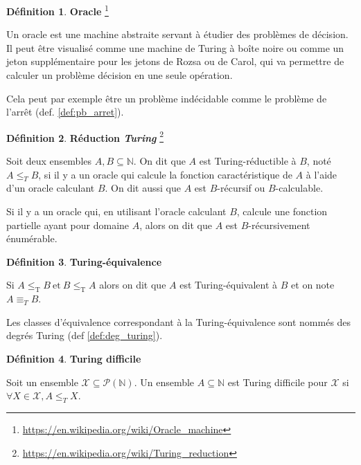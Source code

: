 \documentclass{book}
\theoremstyle{definition}
\newtheorem{definition}{Définition}
\numberwithin{lemma}{subsection}
\numberwithin{theorem}{subsection}
\numberwithin{definition}{subsection}
\numberwithin{proposition}{subsection}
\numberwithin{corollary}{subsection}
\numberwithin{property}{subsection}
\numberwithin{example}{subsection}
\numberwithin{heuristique}{subsection}
\numberwithin{scenario}{subsection}
\begin{document}
            \begin{definition}\textbf{Oracle}
            \footnote{\url{https://en.wikipedia.org/wiki/Oracle\_machine}}
                \par Un oracle est une machine abstraite servant à étudier des problèmes de décision. Il peut être visualisé comme une machine de Turing à boîte noire ou comme un jeton supplémentaire pour les jetons de Rozsa ou de Carol, qui va permettre de calculer un problème décision en une seule opération.
                \par Cela peut par exemple être un problème indécidable comme le problème de l'arrêt (def. \ref{def:pb_arret}).
            \end{definition}
            
            \begin{definition}\textbf{Réduction \textit{Turing}}
            \footnote{\url{https://en.wikipedia.org/wiki/Turing\_reduction}}
                \par Soit deux ensembles $A, B \subseteq \mathbb{N}$. On dit que $A$ est Turing-réductible à $B$, noté $A \leq_T B$, si il y a un oracle qui calcule la fonction caractéristique de $A$ à l'aide d'un oracle calculant $B$. On dit aussi que $A$ est $B$-récursif ou $B$-calculable.
                \par Si il y a un oracle qui, en utilisant l'oracle calculant $B$, calcule une fonction partielle ayant pour domaine $A$, alors on dit que $A$ est $B$-récursivement énumérable.
            \end{definition}
                
            \begin{definition}\textbf{Turing-équivalence}\label{def:Turing_equiv}
                \par Si $A \leq_{\mathrm{T}} B ~ \mathrm{ et } ~ B \leq_{\mathrm{T}} A$ alors on dit que $A$ est Turing-équivalent à $B$ et on note $A \equiv_T B$.
                \par Les classes d'équivalence correspondant à la Turing-équivalence sont nommés des degrés Turing (def \ref{def:deg_turing}).
            \end{definition}
            
            \begin{definition}\textbf{Turing difficile}
                \par Soit un ensemble $\mathcal{X} \subseteq \mathcal{P}(\mathbb{N})$. Un ensemble $A \subseteq \mathbb{N}$ est Turing difficile pour $\mathcal{X}$ si $\forall X \in \mathcal{X}, A \leq_T X$.
            \end{definition}
            
\end{document}
